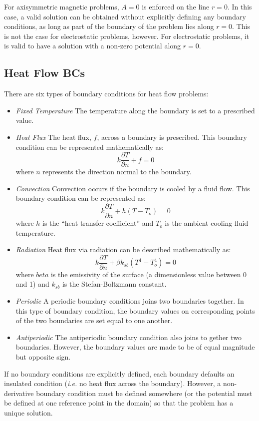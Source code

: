 \documentclass[12pt]{report}
\newcommand{\be}{\begin{equation}}
\newcommand{\ee}{\end{equation}}
\begin{document}
For axisymmetric magnetic problems, $A=0$ is enforced on the line
$r=0$. In this case, a valid solution can be obtained without
explicitly defining any boundary conditions, as long as part of the
boundary of the problem lies along $r=0$.  This is not the case for
electrostatic problems, however.  For electrostatic problems, it is
valid to have a solution with a non-zero potential along $r=0$.

\subsection{Heat Flow BCs}
There are six types of boundary conditions for heat flow problems:

\begin{itemize}
\item {\em Fixed Temperature} The temperature along the boundary is
set to a prescribed value.
\item {\em Heat Flux} The heat flux, $f$, across a boundary is prescribed.  This
boundary condition can be represented mathematically as:
\be k \frac{\partial T}{\partial n} + f = 0 \ee
where $n$ represents the direction normal to the boundary.
\item {\em Convection} Convection occurs if the boundary is cooled by a fluid flow.
This boundary condition can be represented as:
\be k \frac{\partial T}{\partial n} + h \left( T - T_o \right) = 0 \ee
where $h$ is the ``heat transfer coefficient'' and $T_o$ is the ambient
cooling fluid temperature.
\item {\em Radiation}
Heat flux via radiation can be described mathematically as:
\be k \frac{\partial T}{\partial n} + \beta k_{sb} \left( T^4 - T_o^4 \right) = 0 \ee
where $beta$ is the emissivity of the surface (a dimensionless value between 0 and 1)
and $k_{sb}$ is the Stefan-Boltzmann constant.
\item {\em Periodic}
A periodic boundary conditions joins two boundaries together.  In this
type of boundary condition, the boundary values on 
corresponding points of the two boundaries are set equal to one another.
\item {\em Antiperiodic}
The antiperiodic boundary condition also joins to gether two boundaries.
However, the boundary values are made to be of equal magnitude but
opposite sign.
\end{itemize}

If no boundary conditions are explicitly defined, each boundary
defaults an insulated condition ({\em i.e.} no heat flux across the boundary).
However, a non-derivative boundary condition must be defined somewhere (or the
potential must be defined at one reference point in the domain) so
that the problem has a unique solution.
\end{document}

